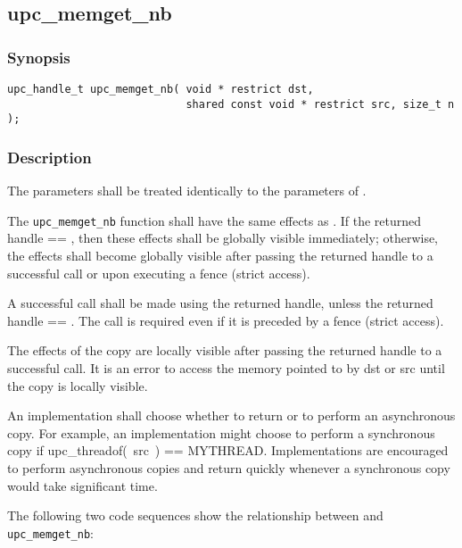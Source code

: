 \newpage
\subsection{upc\_memget\_nb}
\def\function{{\tt upc\_memget\_nb}}

\subsubsection{Synopsis}

\begin{verbatim}
upc_handle_t upc_memget_nb( void * restrict dst,
                            shared const void * restrict src, size_t n );
\end{verbatim}

\subsubsection{Description}

\npf The parameters shall be treated identically to the parameters of
\memget{}.

\np The \function{} function shall have the same effects as \memget{}.
If the returned handle == \complete{}, then these effects shall be globally
visible immediately; otherwise, the effects shall become globally visible after
passing the returned handle to a successful \gsync{} call or upon executing a
fence (strict access).

\np A successful \gsync{} call shall be made using the returned handle,
unless the returned handle == \complete{}.  The call is required even if it is
preceded by a fence (strict access).

\np The effects of the copy are locally visible after passing the
returned handle to a successful \lsync{} call.  It is an error to access the
memory pointed to by dst or src until the copy is locally visible.

\np An implementation shall choose whether to return \complete{} or
to perform an asynchronous copy.  For example, an implementation might
choose to perform a synchronous copy if upc\_threadof(~src~) == MYTHREAD.
Implementations are encouraged to perform asynchronous copies and return
quickly whenever a synchronous copy would take significant time.

\np The following two code sequences show the relationship between
\memget{} and \function{}:

